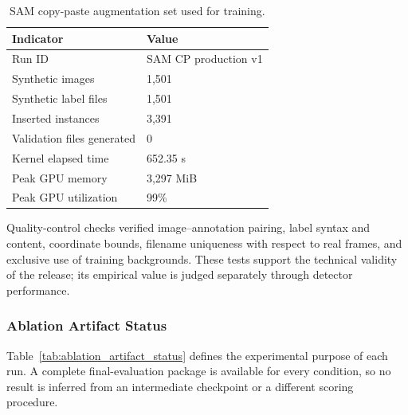 \begin{table}[!t]
  \caption{SAM copy-paste augmentation set used for training.}
  \label{tab:augmentation_release_summary}
  \centering
  \small
  \begin{tabular}{@{}p{}p{}@{}}
    \toprule
    \textbf{Indicator} & \textbf{Value} \\
    \midrule
    Run ID & SAM CP production v1 \\
    Synthetic images & 1,501 \\
    Synthetic label files & 1,501 \\
    Inserted instances & 3,391 \\
    Validation files generated & 0 \\
    Kernel elapsed time & 652.35 s \\
    Peak GPU memory & 3,297 MiB \\
    Peak GPU utilization & 99\% \\
    \bottomrule
  \end{tabular}
\end{table}

Quality-control checks verified image--annotation pairing, label syntax and content, coordinate bounds, filename uniqueness with respect to real frames, and exclusive use of training backgrounds. These tests support the technical validity of the release; its empirical value is judged separately through detector performance.

\subsubsection{Ablation Artifact Status}
\label{sec:ablation_artifact_status}

Table~\ref{tab:ablation_artifact_status} defines the experimental purpose of each run. A complete final-evaluation package is available for every condition, so no result is inferred from an intermediate checkpoint or a different scoring procedure.

